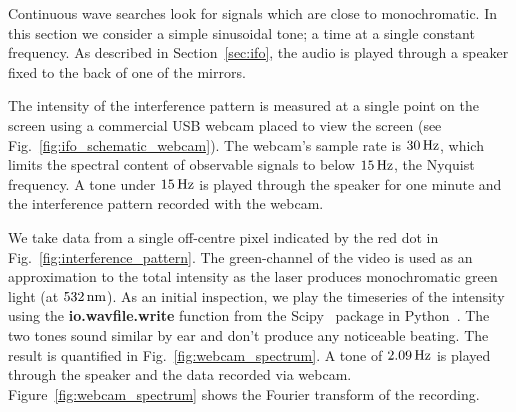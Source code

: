 \documentclass[paper-main.tex]{subfiles}
\begin{document}

Continuous wave searches look for signals which are close to monochromatic. 
In this section we consider a simple sinusoidal tone; a time at a single constant frequency. 
As described in Section~\ref{sec:ifo}, the audio is played through a speaker fixed to the back of one of the mirrors.


The intensity of the interference pattern is measured at a single point on the screen using a commercial USB webcam placed to view the screen (see Fig.~\ref{fig:ifo_schematic_webcam}). 
The webcam's sample rate is $30\,{\rm Hz}$, which limits the spectral content of observable signals to below $15\,{\rm Hz}$, the Nyquist frequency.
A tone under $15\,{\rm Hz}$ is played through the speaker for one minute and the interference pattern recorded with the webcam. 


We take data from a single off-centre pixel indicated by the red dot in Fig.~\ref{fig:interference_pattern}. 
The green-channel of the video is used as an approximation to the total intensity as the laser produces monochromatic green light (at $532\,{\rm nm}$).
As an initial inspection, we play the timeseries of the intensity using the \textbf{io.wavfile.write} function from the Scipy~\cite{scipy} package in Python~\cite{python}. 
The two tones sound similar by ear and don't produce any noticeable beating. 
The result is quantified in Fig.~\ref{fig:webcam_spectrum}. 
A tone of $2.09\,{\rm Hz}$ is played through the speaker and the data recorded via webcam. 
Figure~\ref{fig:webcam_spectrum} shows the Fourier transform of the recording.
\end{document}
